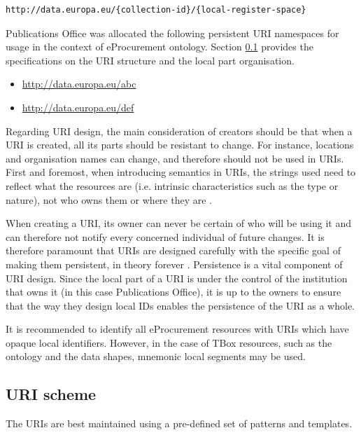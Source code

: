 \begin{lstlisting}[language=XML,frame=none, basicstyle=\footnotesize\ttfamily,breaklines=true]
http://data.europa.eu/{collection-id}/{local-register-space}
\end{lstlisting}
	
	Publications Office was allocated the following persistent URI namespaces for usage in the context of eProcurement ontology. Section \ref{sec:uri-scheme} provides the specifications on the URI structure and the local part organisation. 

	\begin{itemize}
		\item \url{http://data.europa.eu/abc}
		\item \url{http://data.europa.eu/def}
	\end{itemize}
	
	Regarding URI design, the main consideration of creators should be that when a URI is created, all its parts should be resistant to change. For instance, locations and organisation names can change, and therefore should not be used in URIs. First and foremost, when introducing semantics in URIs, the strings used need to reflect what	the resources are (i.e. intrinsic characteristics such as the type or nature), not who owns them or where they are \cite{d4.02.02-2018}. 

	When creating a URI, its owner can never be certain of who will be using it and can	therefore not notify every concerned individual of future changes. It is therefore	paramount that URIs are designed carefully with the specific goal of making them persistent, in theory forever \cite{burners1998cool}. Persistence is a vital component of URI design.	Since the local part of a URI is under the control of the institution that owns it (in this case Publications Office), it is up to the owners to ensure that the way they design local IDs enables the persistence of the URI as a whole.
	
	It is recommended to identify all eProcurement resources with URIs which have opaque local identifiers. However, in the case of TBox resources, such as the ontology and the data shapes, mnemonic local segments may be used.
		
	\subsection{URI scheme}
	\label{sec:uri-scheme}
	
	The URIs are best maintained using a pre-defined set of patterns and templates. 

